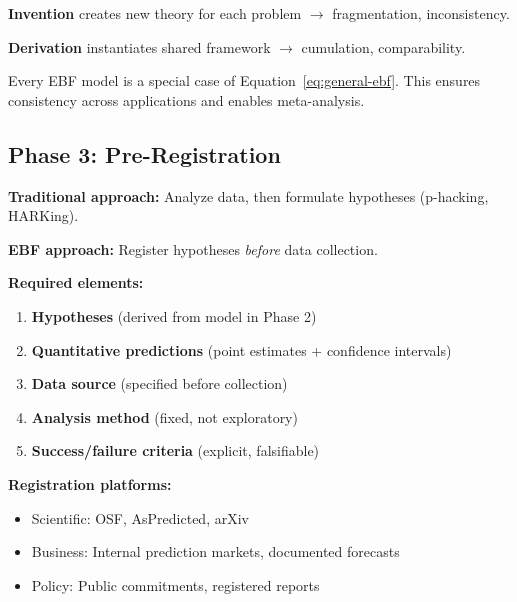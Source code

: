 \begin{tcolorbox}[colback=green!5!white, colframe=green!75!black,
    title=\textbf{Key Insight: Derivation vs. Invention}]

\textbf{Invention} creates new theory for each problem $\to$ fragmentation, inconsistency.

\textbf{Derivation} instantiates shared framework $\to$ cumulation, comparability.

Every EBF model is a special case of Equation~\ref{eq:general-ebf}. This ensures
consistency across applications and enables meta-analysis.

\end{tcolorbox}

\subsection{Phase 3: Pre-Registration}

\textbf{Traditional approach:} Analyze data, then formulate hypotheses (p-hacking, HARKing).

\textbf{EBF approach:} Register hypotheses \textit{before} data collection.

\begin{tcolorbox}[colback=gray!5!white, colframe=gray!75!black,
    title=\textbf{Phase 3: Pre-Registration Template}]

\textbf{Required elements:}
\begin{enumerate}[nosep]
    \item \textbf{Hypotheses} (derived from model in Phase 2)
    \item \textbf{Quantitative predictions} (point estimates + confidence intervals)
    \item \textbf{Data source} (specified before collection)
    \item \textbf{Analysis method} (fixed, not exploratory)
    \item \textbf{Success/failure criteria} (explicit, falsifiable)
\end{enumerate}

\textbf{Registration platforms:}
\begin{itemize}[nosep]
    \item Scientific: OSF, AsPredicted, arXiv
    \item Business: Internal prediction markets, documented forecasts
    \item Policy: Public commitments, registered reports
\end{itemize}

\end{tcolorbox}

